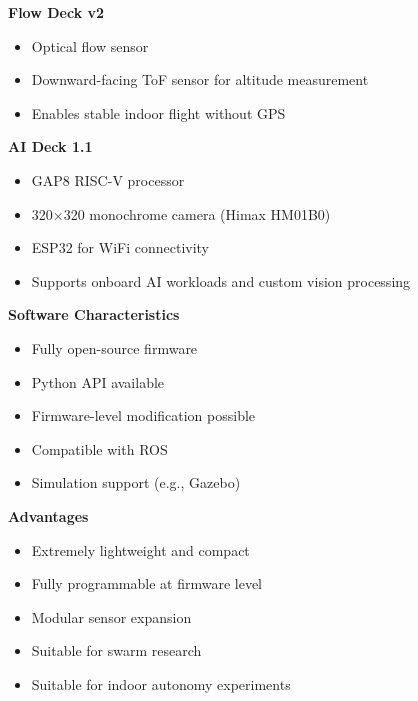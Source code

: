 \documentclass{book}
\providecommand{\ProjectDeepHeading}[2]{%
    \par\medskip\noindent\textbf{#2}\par\smallskip
}
\begin{document}
            \ProjectDeepHeading{6}{Flow Deck v2}
            
            \begin{itemize}
                \item Optical flow sensor
                \item Downward-facing ToF sensor for altitude measurement
                \item Enables stable indoor flight without GPS
                \end{itemize}
            
            \ProjectDeepHeading{6}{AI Deck 1.1}
            
            \begin{itemize}
                \item GAP8 RISC-V processor
                \item 320×320 monochrome camera (Himax HM01B0)
                \item ESP32 for WiFi connectivity
                \item Supports onboard AI workloads and custom vision processing
                \end{itemize}
        
        \ProjectDeepHeading{5}{Software Characteristics}
            
            \begin{itemize}
                \item Fully open-source firmware
                \item Python API available
                \item Firmware-level modification possible
                \item Compatible with ROS
                \item Simulation support (e.g., Gazebo)
            \end{itemize}
        
        \ProjectDeepHeading{5}{Advantages}
            
            \begin{itemize}
                \item Extremely lightweight and compact
                \item Fully programmable at firmware level
                \item Modular sensor expansion
                \item Suitable for swarm research
                \item Suitable for indoor autonomy experiments
            \end{itemize}
        
\end{document}
